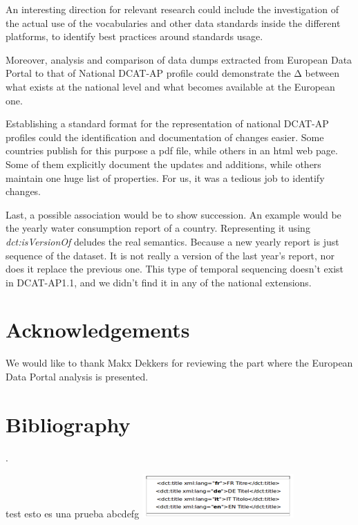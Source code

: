 \documentclass[<options>]{elsarticle}
\begin{document}
An interesting direction for relevant research could include the investigation of the actual use of the vocabularies and other data standards inside the different platforms, to identify best practices around standards usage. 

Moreover, analysis and comparison of data dumps extracted from European Data Portal to that of National DCAT-AP profile could demonstrate the Δ between what exists at the national level and what becomes available at the European one. 

Establishing a standard format for the representation of national DCAT-AP profiles could the identification and documentation of changes easier. Some countries publish for this purpose a pdf file, while others in an html web page. Some of them explicitly document the updates and additions, while others maintain one huge list of properties. For us, it was a tedious job to identify changes.
 
Last, a possible association would be to show succession. An example would be the yearly water consumption report of a country. Representing it using \textit{dct:isVersionOf }deludes the real semantics. Because a new yearly report is just sequence of the dataset. It is not really a version of the last year’s report, nor does it replace the previous one. This type of temporal sequencing doesn’t exist in DCAT-AP1.1, and we didn’t find it in any of the national extensions. 

\section{Acknowledgements}
We would like to thank Makx Dekkers for reviewing the part where the European Data Portal analysis is presented.



\section{Bibliography}
\cite{ahmadi,Attard:2016:DDG:3081418.3081424,ATTARD2015399,Cyganiak:2010:SLG:1839707.1839754,DekkersEtAl:SemStats2016,Ding2011TWCLA,Ding:2012:LOG:2360752.2360982,EJLT238,Janssen:2014:IBO:2780225.2780310,pub.1052835103,KLIMEK20181,maali:hal-01056576,neum-etal-LDOW2017,Neumaier:2016:AQA:3012403.2964909,pellegrino2017,RUIJER201745,ruijer,DBLP:series/lncs/WaalWEJMW14,carrara,ZUIDERWIJK201417,Zuiderwijk2014TheNE,DBLP:journals/polity/ZuiderwijkJKP16}.



test esto es una prueba abcdefg
\includegraphics[]{replace999.png}
\end{document}
